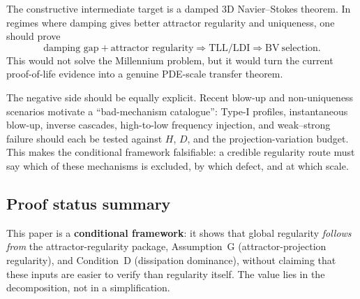 \documentclass[12pt,a4paper]{article}
\theoremstyle{definition}
\theoremstyle{plain}
\theoremstyle{remark}
\begin{document}
The constructive intermediate target is a damped 3D Navier--Stokes
theorem.  In regimes where damping gives better attractor regularity and
uniqueness, one should prove
\[
  \text{damping gap} + \text{attractor regularity}
  \Longrightarrow
  \mathrm{TLL/LDI}
  \Longrightarrow
  \mathrm{BV\ selection}.
\]
This would not solve the Millennium problem, but it would turn the
current proof-of-life evidence into a genuine PDE-scale transfer theorem.

The negative side should be equally explicit.  Recent blow-up and
non-uniqueness scenarios motivate a ``bad-mechanism catalogue'':
Type-I profiles, instantaneous blow-up, inverse cascades, high-to-low
frequency injection, and weak--strong failure should each be tested
against $H$, $D$, and the projection-variation budget.  This makes the
conditional framework falsifiable: a credible regularity route must say
which of these mechanisms is excluded, by which defect, and at which
scale.

\subsection*{Proof status summary}

This paper is a \textbf{conditional framework}: it shows that global regularity \emph{follows from} the attractor-regularity package, Assumption~G (attractor-projection regularity), and Condition~D (dissipation dominance), without claiming that these inputs are easier to verify than regularity itself.  The value lies in the decomposition, not in a simplification.
\end{document}
